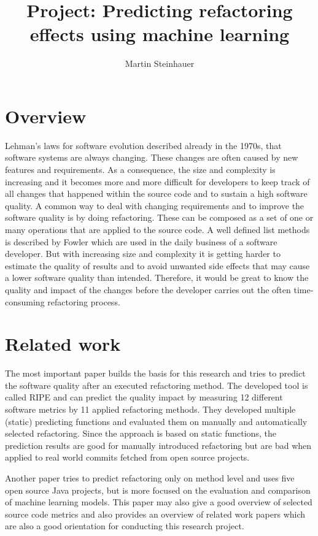 \documentclass{article}
\title{Project: Predicting refactoring effects using machine learning}
\author{Martin Steinhauer }
\begin{document}
\maketitle

\section{Overview}
Lehman’s laws for software evolution \cite{lehmanslaws} described already in the 1970s, that software systems are always changing. These changes are often caused by new features and requirements. As a consequence, the size and complexity is increasing and it becomes more and more difficult for developers to keep track of all changes that happened within the source code and to sustain a high software quality. A common way to deal with changing requirements and to improve the software quality is by doing refactoring. These can be composed as a set of one or many operations that are applied to the source code. A well defined list methods is described by Fowler \cite{fowler2018refactoring} which are used in the daily business of a software developer. But with increasing size and complexity it is getting harder to estimate the quality of results and to avoid unwanted side effects that may cause a lower software quality than intended. Therefore, it would be great to know the quality and impact of the changes before the developer carries out the often time-consuming refactoring process.

\section{Related work}
The most important paper \cite{chaparro} builds the basis for this research and tries to predict the software quality after an executed refactoring method. The developed tool is called RIPE and can predict the quality impact by measuring 12 different software metrics by 11 applied refactoring methods. They developed multiple (static) predicting functions and evaluated them on manually and automatically selected refactoring. Since the approach is based on static functions, the prediction results are good for manually introduced refactoring but are bad when applied to real world commits fetched from open source projects.

Another paper \cite{methodlevel} tries to predict refactoring only on method level and uses five open source Java projects, but is more focused on the evaluation and comparison of machine learning models. This paper may also give a good overview of selected source code metrics and also provides an overview of related work papers \cite{rel1, rel2, rel3} which are also a good orientation for conducting this research project.
\end{document}
